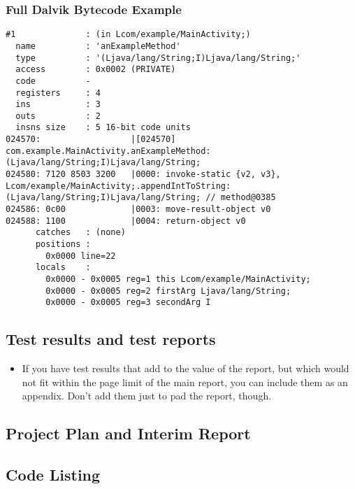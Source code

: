 \subsubsection{Full Dalvik Bytecode Example}
\label{sec:sec:full_dalvik_bytecode_example}

\begin{lstlisting}
#1              : (in Lcom/example/MainActivity;)
  name          : 'anExampleMethod'
  type          : '(Ljava/lang/String;I)Ljava/lang/String;'
  access        : 0x0002 (PRIVATE)
  code          -
  registers     : 4
  ins           : 3
  outs          : 2
  insns size    : 5 16-bit code units
024570:                  |[024570] com.example.MainActivity.anExampleMethod:(Ljava/lang/String;I)Ljava/lang/String;
024580: 7120 8503 3200   |0000: invoke-static {v2, v3}, Lcom/example/MainActivity;.appendIntToString:(Ljava/lang/String;I)Ljava/lang/String; // method@0385
024586: 0c00             |0003: move-result-object v0
024588: 1100             |0004: return-object v0
      catches   : (none)
      positions :
        0x0000 line=22
      locals    :
        0x0000 - 0x0005 reg=1 this Lcom/example/MainActivity;
        0x0000 - 0x0005 reg=2 firstArg Ljava/lang/String;
        0x0000 - 0x0005 reg=3 secondArg I
\end{lstlisting}

\subsection{Test results and test reports}

\begin{mdframed}
	\begin{itemize}
		\item If you have test results that add to the value of the report, but
		which would not fit within the page limit of the main report, you can
		include them as an appendix. Don't add them just to pad the report, though.
	\end{itemize}
\end{mdframed}

\subsection{Project Plan and Interim Report}




\subsection{Code Listing}


